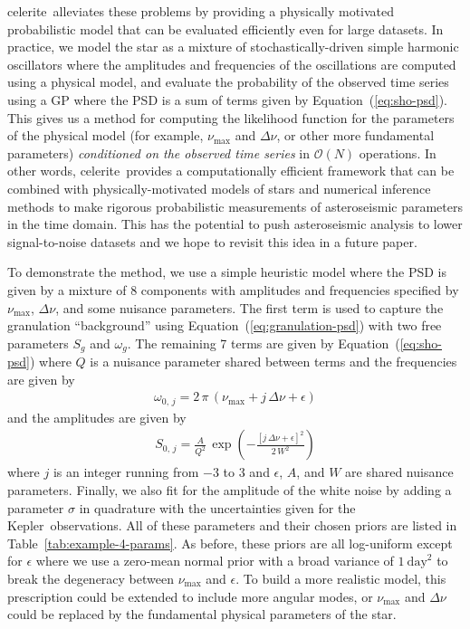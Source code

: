 \documentclass[manuscript, letterpaper]{aastex6}
\newcommand{\project}[1]{\textsf{#1}}
\newcommand{\kepler}{\project{Kepler}}
\newcommand{\celerite}{\project{celerite}}
\renewcommand{\eqref}[1]{\ref{eq:#1}}
\newcommand{\Eq}[1]{Equation~(\eqref{#1})}
\newcommand{\eq}[1]{\Eq{#1}}
\newcommand{\response}[1]{{\color{blue}#1}}
\begin{document}
\celerite\ alleviates these problems by providing a physically motivated
probabilistic model that can be evaluated efficiently even for large datasets.
In practice, we model the star as a mixture of stochastically-driven simple
harmonic oscillators where the amplitudes and frequencies of the oscillations
are computed using a physical model, and evaluate the probability of the
observed time series using a GP where the PSD is a sum of terms given by
\eq{sho-psd}.
This gives us a method for computing the likelihood function for the
parameters of the physical model (for example, $\nu_\mathrm{max}$ and $\Delta
\nu$, or other more fundamental parameters) \emph{conditioned on the observed
time series} in $\mathcal{O}(N)$ operations.
In other words, \celerite\ provides a computationally efficient framework that
can be combined with physically-motivated models of stars and numerical
inference methods to make rigorous probabilistic measurements of asteroseismic
parameters in the time domain.
This has the potential to push asteroseismic analysis to lower signal-to-noise
datasets and we hope to revisit this idea in a future paper.

To demonstrate the method, we use a simple heuristic model where the PSD is
given by a mixture of 8 components with amplitudes and frequencies specified
by $\nu_\mathrm{max}$, $\Delta \nu$, and some nuisance parameters.
The first term is used to capture the granulation ``background''
\citep{Kallinger:2014} using \eq{granulation-psd} with two free parameters
$S_g$ and $\omega_g$.
The remaining  7 terms are given by \eq{sho-psd} where $Q$ is a nuisance
parameter shared between terms and the frequencies are given by
\begin{eqnarray}
\omega_{0,\,j} = 2\,\pi\,(\nu_\mathrm{max} + j\,\Delta\nu + \epsilon)
\end{eqnarray}
and the amplitudes are given by
\begin{eqnarray}
S_{0,\,j} =
    \frac{A}{Q^2}\,\exp\left(-\frac{[j\,\Delta\nu + \epsilon]^2}{2\,W^2}\right)
\end{eqnarray}
where $j$ is an integer running from $-3$ to 3 and $\epsilon$, $A$, and $W$
are shared nuisance parameters.
\response{Finally, we also fit for the amplitude of the white noise by adding
a parameter $\sigma$ in quadrature with the uncertainties given for the
\kepler\ observations.
All of these parameters and their chosen priors are listed in
Table~\ref{tab:example-4-params}.
As before, these priors are all log-uniform except for $\epsilon$ where we use
a zero-mean normal prior with a broad variance of $1~\mathrm{day}^2$ to break
the degeneracy between $\nu_\mathrm{max}$ and $\epsilon$.
}
To build a more realistic model, this prescription could be extended to
include more angular modes, or $\nu_\mathrm{max}$ and $\Delta \nu$ could be
replaced by the fundamental physical parameters of the star.
\end{document}
